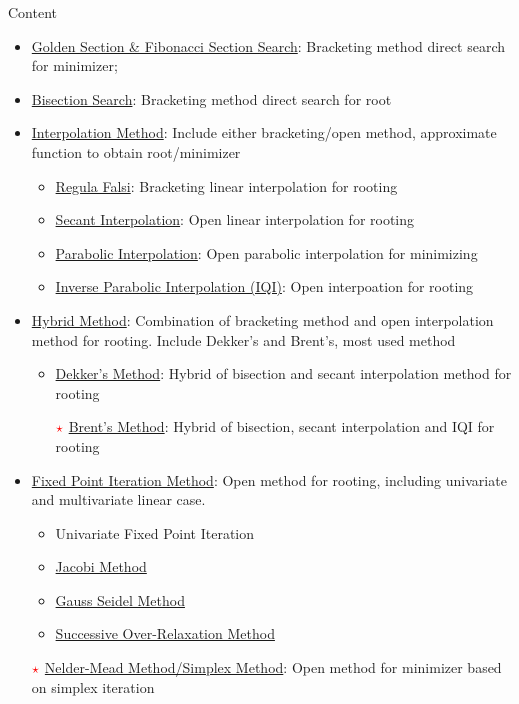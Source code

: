 \begin{point}
    Content
\end{point}
\begin{itemize}[topsep=2pt,itemsep=0pt]
    \item \hyperlink{GoldenSection}{Golden Section \& Fibonacci Section Search}: Bracketing method direct search for minimizer;
    \item \hyperlink{Bisection}{Bisection Search}: Bracketing method direct search for root
    \item \hyperlink{Interpolation}{Interpolation Method}: Include either bracketing/open method, approximate function to obtain root/minimizer
    \begin{itemize}[topsep=2pt,itemsep=0pt]
        \item \hyperlink{RegulaFalsi}{Regula Falsi}: Bracketing linear interpolation for rooting
        \item \hyperlink{Secant}{Secant Interpolation}: Open linear interpolation for rooting
        \item \hyperlink{ParabolicInterpolation}{Parabolic Interpolation}: Open parabolic interpolation for minimizing
        \item \hyperlink{InverseQuadric}{Inverse Parabolic Interpolation (IQI)}: Open interpoation for rooting
    \end{itemize}
    
    \item \hyperlink{HybridMethod}{Hybrid Method}: Combination of bracketing method and open interpolation method for rooting. Include Dekker's and Brent's, most used method
    \begin{itemize}[topsep=2pt,itemsep=0pt]
        \item \hyperlink{Dekker}{Dekker's Method}: Hybrid of bisection and secant interpolation method for rooting
        \item[$\color{red}\star$] \hyperlink{Brent}{Brent's Method}: Hybrid of bisection, secant interpolation and IQI for rooting
    \end{itemize}
       
    \item \hyperlink{FixedPoint}{Fixed Point Iteration Method}: Open method for rooting, including univariate and multivariate linear case.
    \begin{itemize}[topsep=2pt,itemsep=0pt]
        \item Univariate Fixed Point Iteration
        \item \hyperlink{JacobiMethod}{Jacobi Method}
        \item \hyperlink{GaussSeidelMethod}{Gauss Seidel Method}
        \item \hyperlink{SORMethod}{Successive Over-Relaxation Method}
    \end{itemize}
    
        
    \item[$\color{red}\star$] \hyperlink{Simplex}{Nelder-Mead Method/Simplex Method}: Open method for minimizer based on simplex iteration
\end{itemize}


